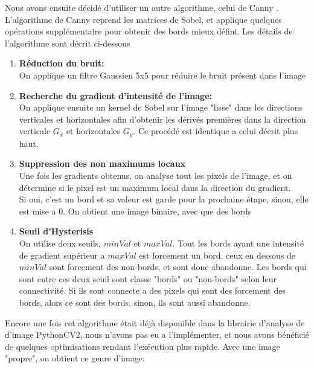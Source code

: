 \documentclass[a4paper, 12pt, titlepage, oneside, french]{article}
\begin{document}
	Nous avons ensuite décidé d'utiliser un autre algorithme, celui de Canny \cite{CannyOp}. L'algorithme de Canny reprend les matrices de Sobel, et applique quelques opérations supplémentaire pour obtenir des bords mieux défini. Les détails de l'algorithme sont décrit ci-dessous
	\begin{enumerate}
		\item \textbf{Réduction du bruit:}\\
			\indent On applique un filtre Gaussien 5x5 pour réduire le bruit présent dans l'image
		\item \textbf{Recherche du gradient d'intensité de l'image:}\\  
			\indent On applique ensuite un kernel de Sobel sur l'image "lisse" dans les directions verticales et horizontales afin d'obtenir les dérivés premières dans
			la direction verticale $G_x$ et horizontales $G_y$. Ce procédé est identique a celui décrit plus haut.

		\item \textbf{Suppression des non maximums locaux}\\
			\indent Une fois les gradients obtenus, on analyse tout les pixels de l'image, et on détermine si le pixel est un maximum local dans la
			direction du gradient. \\
			Si oui, c'est un bord et sa valeur est garde pour la prochaine étape, sinon, elle est mise a 0. On obtient une image binaire, avec que des bords

		\newpage

		\item \textbf{Seuil d'Hysterisis} \\
			\indent On utilise deux seuils, $minVal$ et $maxVal$. Tout les bords ayant une intensité de gradient supérieur a $maxVal$ est forcement un
			bord, ceux en dessous de $minVal$ sont forcement des non-bords, et sont donc abandonne. Les bords qui sont entre ces deux seuil sont classe
			"bords" ou "non-bords" selon leur connectivité. Si ils sont connecte a des pixels qui sont des forcement des bords, alors ce sont des bords,
			sinon, ils sont aussi abandonne.\\

	\end{enumerate}
	Encore une fois cet algorithme était déjà disponible dans la librairie d'analyse de d'image PythonCV2, nous n'avons pas eu a l'implémenter, et nous avons bénéficié de quelques optimisations rendant l'exécution plus rapide.
	Avec une image "propre", on obtient ce genre d'image:
\end{document}
